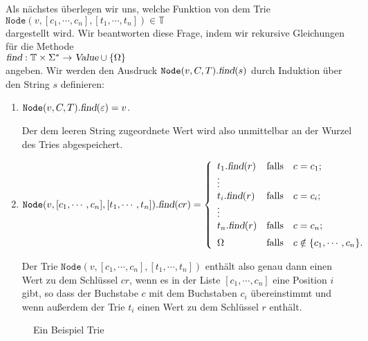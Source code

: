 Als n\"achstes \"uberlegen wir uns, welche Funktion von dem Trie \\[0.2cm]
\hspace*{1.3cm}  $\texttt{Node}(v, [c_1, \cdots, c_n], [t_1, \cdots, t_n]) \in \mathbb{T}$ \\[0.2cm]
dargestellt wird.  Wir beantworten diese Frage, indem wir rekursive Gleichungen f\"ur die
Methode \\[0.2cm]
\hspace*{1.3cm} $\textsl{find}: \mathbb{T} \times \Sigma^* \rightarrow \textsl{Value} \cup \{ \Omega\}$
\\[0.2cm]
angeben.  Wir werden den Ausdruck $\texttt{Node}(v,C,T).\textsl{find}(s)$ durch
Induktion \"uber den String $s$ 
definieren:
\begin{enumerate}
\item $\texttt{Node}(v, C, T).\textsl{find}(\varepsilon) = v$.

      Der dem leeren String zugeordnete Wert wird also unmittelbar an der Wurzel
      des Tries abgespeichert.
\item $\texttt{Node}(v, [c_1, \cdots, c_n], [t_1, \cdots, t_n]).\textsl{find}(cr) = 
        \left\{
        \begin{array}{ll}
        t_1.\textsl{find}(r) & \mbox{falls} \quad c = c_1 \mbox{;} \\
        \vdots &                                     \\
        t_i.\textsl{find}(r) & \mbox{falls} \quad c = c_i \mbox{;} \\
        \vdots &                                     \\
        t_n.\textsl{find}(r) & \mbox{falls} \quad c = c_n \mbox{;} \\[0.2cm]
        \Omega               & \mbox{falls} \quad c \notin \{c_1,\cdots,c_n\} \mbox{.}         
        \end{array}
       \right.$

      Der Trie $\texttt{Node}(v, [c_1, \cdots, c_n], [t_1, \cdots, t_n])$ enth\"alt also genau
      dann einen Wert zu dem Schl\"ussel $cr$, wenn es in der Liste $[c_1, \cdots, c_n]$
      eine Position $i$ gibt, so dass der Buchstabe $c$ mit dem Buchstaben $c_i$
      \"ubereinstimmt und wenn au{\ss}erdem der Trie $t_i$ einen Wert zu dem
      Schl\"ussel $r$ enth\"alt.
\end{enumerate}

\begin{figure}[!ht]
  \centering
  \caption{Ein Beispiel Trie}
  \label{fig:trie}
\end{figure}

